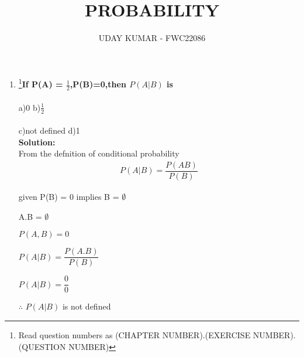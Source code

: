 \documentclass{article}
\newcommand{\solution}{\noindent \textbf{Solution: }}
\begin{document}
\title{PROBABILITY}
\author{\Large UDAY KUMAR - FWC22086}
\date{}

\maketitle

\begin{enumerate}[label=13.\arabic{enumi}.\arabic{enumii}]%
\setcounter{enumi}{0}
\setcounter{enumii}{6}

\item \footnote{Read question numbers as (CHAPTER NUMBER).(EXERCISE NUMBER).(QUESTION NUMBER)}\textbf {If P(A) = $\frac{1}{2}$,P(B)=0,then \textbf{$P(A|B)$} is }
\hspace{15mm}\\
\\
a)0 \hspace{50mm} b)$\frac{1}{2}$
\\
\\
c)not defined \hspace{36mm} d)1\\[1ex]
	\solution\\
		From the defnition of conditional probability\\
\begin{align*}
P(A|B) = \dfrac{P(AB)}{P(B)}
\end{align*}

given P(B) = 0 implies  B = $\emptyset$ 
\begin{center}
A.B = $\emptyset$
\end{center}
\begin{center}
$P(A,B) =0$ 
\end{center}
\begin{center}
$P(A|B) = \dfrac{P(A.B)}{P(B)}$
\end{center}
\begin{center}
$P(A|B) = \dfrac{0}{0}$
\end{center}
\begin{center}
$\therefore$ $P(A|B)$ is not defined
\end{center}
		

    

\end{enumerate}
\end{document}
